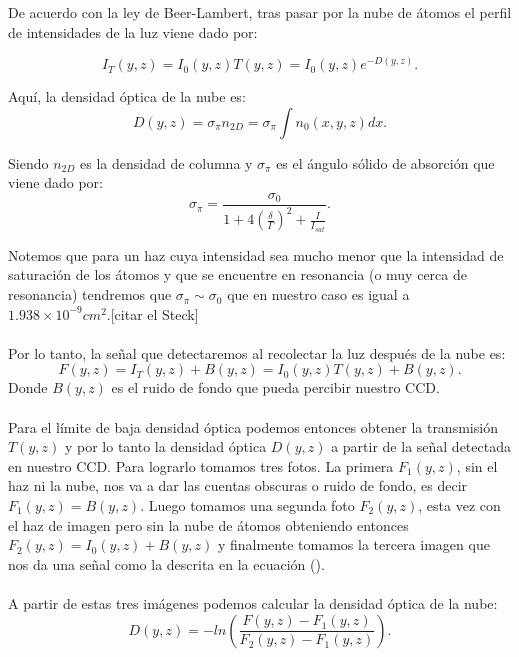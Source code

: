 \documentclass[12pt,twoside]{article}
\begin{document}
De acuerdo con la ley de Beer-Lambert, tras pasar por la nube de átomos el perfil de intensidades de la luz viene dado por:

\begin{equation}
%
    I_{T}(y,z) = I_{0}(y,z)T(y,z) = I_{0}(y,z) e^{-D(y,z)}.
%
\end{equation}

Aquí, la densidad óptica de la nube es:
\begin{equation}
%
    D(y,z) = \sigma_{\pi} n_{2D} = \sigma_{\pi} \int n_{0}(x,y,z) dx.
%
\end{equation}

Siendo $n_{2D}$ es la densidad de columna y $\sigma_{\pi}$ es el ángulo sólido de absorción que viene dado por:
\begin{equation}
%
    \sigma_{\pi} = \frac{\sigma_{0}}{1 + 4(\frac{\delta}{\Gamma})^2 + \frac{I}{I_{sat}}}.
%
\end{equation}

Notemos que para un haz cuya intensidad sea mucho menor que la intensidad de saturación de los átomos y que se encuentre en resonancia (o muy cerca de resonancia) tendremos que $\sigma_{\pi} \sim \sigma_{0}$ que en nuestro caso es igual a $1.938 \times 10^{-9} cm^2$.[citar el Steck]\\
\\
Por lo tanto, la señal que detectaremos al recolectar la luz después de la nube es:
\begin{equation}
    F(y,z) = I_{T}(y,z) + B(y,z) = I_{0}(y,z)T(y,z) + B(y,z).
\end{equation}
Donde $B(y,z)$ es el ruido de fondo que pueda percibir nuestro CCD.\\
\\
Para el límite de baja densidad óptica podemos entonces obtener la transmisión $T(y,z)$ y por lo tanto la densidad óptica $D(y,z)$ a partir de la señal detectada en nuestro CCD. Para lograrlo tomamos tres fotos. La primera $F_{1}(y,z)$, sin el haz ni la nube, nos va a dar las cuentas obscuras o ruido de fondo, es decir $F_{1}(y,z)=B(y,z)$. Luego tomamos una segunda foto $F_{2}(y,z)$, esta vez con el haz de imagen pero sin la nube de átomos obteniendo entonces $F_{2}(y,z) = I_{0}(y,z) + B(y,z)$ y finalmente tomamos la tercera imagen que nos da una señal como la descrita en la ecuación ().\\
\\
A partir de estas tres imágenes podemos calcular la densidad óptica de la nube: 
\begin{equation}
%
    D(y,z) = - ln\left(\frac{F(y,z)-F_{1}(y,z)}{F_{2}(y,z)-F_{1}(y,z)}\right).
%
\end{equation}
\end{document}
